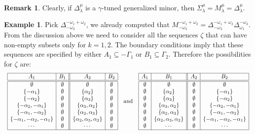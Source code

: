 \documentclass[a4paper]{amsart}
\theoremstyle{definition}
\newtheorem{remark}[theorem]{Remark}
\newtheorem{example}[theorem]{Example}
\begin{document}
\begin{remark}
  Clearly, if $\Delta_\lambda^\mu$ is a $\gamma$-tuned generalized minor, then $\Sigma_\lambda^\mu=M_\lambda^\mu=\Delta_\lambda^\mu$.
\end{remark}

\begin{example}
  Pick $\Delta_{-\omega_3}^{-\omega_1+\omega_2}$, we already computed that $M_{-\omega_3}^{-\omega_1+\omega_2}=\Delta_{-\omega_3}^{-\omega_1+\omega_2} \Delta_{\omega_1}^{-\omega_3}$.
  From the discussion above we need to consider all the sequences $\zeta$ that can have non-empty subsets only for $k=1,2$.
  The boundary conditions imply that these sequences are specified by either $A_1\subseteq-\Gamma_1$ or $B_1\subseteq \Gamma_2$.
  Therefore the possibilities for $\zeta$ are:
  \[
    \begin{array}{ccc}

     \begin{array}{|c|c||c|c|}
       \hline
       A_1 & B_1 & A_2 & B_2\\
       \hline
       \hline
       \emptyset &\emptyset &\emptyset &\emptyset \\
       \{-\alpha_1\} & \emptyset & \{\alpha_2\} & \emptyset\\
       \{-\alpha_2\} & \emptyset & \{\alpha_3\} & \emptyset\\
       \{-\alpha_2,-\alpha_1\} & \emptyset & \{\alpha_3,\alpha_2\} & \emptyset\\
       \{-\alpha_1,-\alpha_2\} & \emptyset & \{\alpha_2,\alpha_3\} & \emptyset\\
       \{-\alpha_1,-\alpha_2,-\alpha_1\} & \emptyset & \{\alpha_2,\alpha_3,\alpha_2\} & \emptyset\\
       \cdots & \emptyset & \cdots & \emptyset \\
       \hline
     \end{array}
     
     & \mbox{and} &

     \begin{array}{|c|c||c|c|}
       \hline
       A_1 & B_1 & A_2 & B_2\\
       \hline
       \hline
       \emptyset &\emptyset &\emptyset &\emptyset \\
       \emptyset &\{\alpha_2\} & \emptyset & \{-\alpha_1\} \\
       \emptyset &\{\alpha_3\} & \emptyset & \{-\alpha_2\} \\
       \emptyset &\{\alpha_3,\alpha_2\} & \emptyset & \{-\alpha_2,-\alpha_1\} \\
       \emptyset &\{\alpha_2,\alpha_3\} & \emptyset & \{-\alpha_1,-\alpha_2\} \\
       \emptyset &\{\alpha_2,\alpha_3,\alpha_2\} & \emptyset & \{-\alpha_1,-\alpha_2,-\alpha_1\} \\
       \emptyset &\cdots & \emptyset & \cdots \\
       \hline
     \end{array}


\end{array}\]
\end{example}
\end{document}
